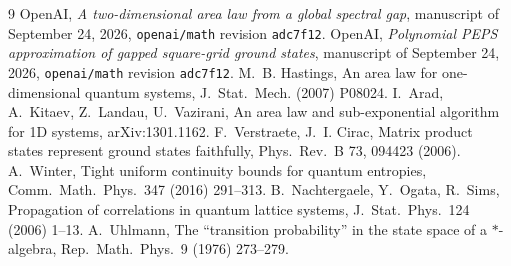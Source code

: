 
\begin{thebibliography}{9}
 OpenAI, \emph{A two-dimensional area law from a global spectral gap}, manuscript of September 24, 2026, \texttt{openai/math} revision \texttt{adc7f12}.
 OpenAI, \emph{Polynomial PEPS approximation of gapped square-grid ground states}, manuscript of September 24, 2026, \texttt{openai/math} revision \texttt{adc7f12}.
 M.~B. Hastings, An area law for one-dimensional quantum systems, J.~Stat.~Mech. (2007) P08024.
 I.~Arad, A.~Kitaev, Z.~Landau, U.~Vazirani, An area law and sub-exponential algorithm for 1D systems, arXiv:1301.1162.
 F.~Verstraete, J.~I. Cirac, Matrix product states represent ground states faithfully, Phys.~Rev.~B 73, 094423 (2006).
 A.~Winter, Tight uniform continuity bounds for quantum entropies, Comm.~Math.~Phys.~347 (2016) 291--313.
 B.~Nachtergaele, Y.~Ogata, R.~Sims, Propagation of correlations in quantum lattice systems, J.~Stat.~Phys.~124 (2006) 1--13.
 A.~Uhlmann, The ``transition probability'' in the state space of a $*$-algebra, Rep.~Math.~Phys.~9 (1976) 273--279.
\end{thebibliography}

